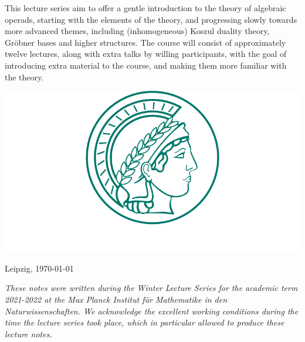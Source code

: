 \documentclass[fleqn, a4paper, twoside]{article}
\title{\vspace{-5 em}\setstretch{0.85}{\textbf{Algebraic operads, Koszul duality and Gr\"obner bases: an introduction}}}
\author{P. Tamaroff}
\date{August 22 and 24}
\newcommand{\0}{\langle 0\rangle}
\DeclareRobustCommand{\[}{\begin{equation}}%
\DeclareRobustCommand{\]}{\end{equation}}%
\theoremstyle{mytheorem}
\theoremstyle{introthm}
\theoremstyle{mydefinition}
\theoremstyle{mydefinition2}
\theoremstyle{plain} %
\newcommand{\?}{\,?\,}
\theoremstyle{mytheorem}
\theoremstyle{plain} %
\renewenvironment{abstract}{%
\small\begin{center}
\begin{minipage}{.9\textwidth}
}
{\par\noindent\end{minipage}\end{center}\vspace{3 em}}
\newcommand\blankpage{%
    \null
    \thispagestyle{empty}%
    \newpage}
\begin{document}
\pagecolor{pagecolor}
\maketitle


\thispagestyle{empty}

\begin{abstract}
This lecture series aim to offer a gentle introduction
to the theory of algebraic operads, starting with the
elements of the theory, and progressing slowly towards
more advanced themes, including (inhomogeneous)
Koszul duality theory, Gr\"obner bases and higher
structures. The course will consist of approximately
twelve lectures, along with extra talks by
willing participants, with the goal of introducing extra
material to the course, and making them more
familiar with the theory.
\end{abstract}

\vspace{2 cm}

\begin{center}
\includegraphics[scale=.35]{logoMPG.png}
\end{center}

\vfill

\hfill	Leipzig, \today


\afterpage{\blankpage}

\newpage

\vspace*{\fill} 
\emph{These notes were written during the Winter Lecture
Series for the academic term 2021-2022 at the \emph{Max
Planck Institut f\"ur Mathematike in den Naturwissenschaften}.
We acknowledge the excellent working
conditions during the time the lecture series took place,
which in particular allowed to produce these lecture notes. }
\vspace*{\fill} 
 \afterpage{\blankpage}
\end{document}
